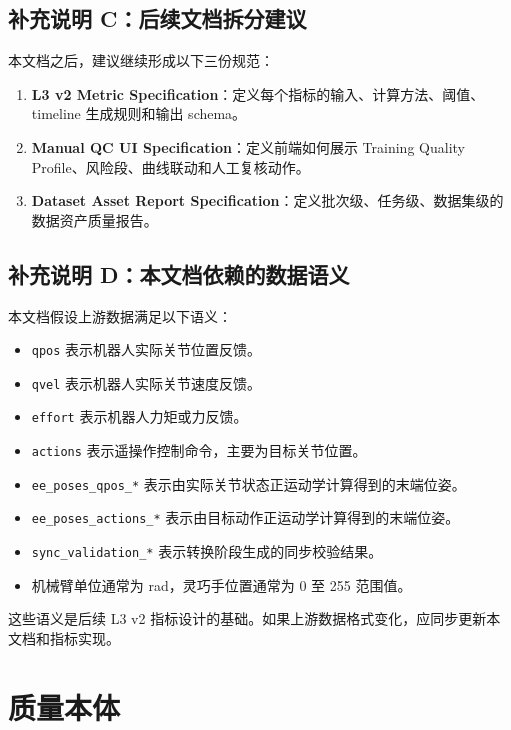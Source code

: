\documentclass[UTF8,zihao=-4,oneside,openany]{ctexrep}
\begin{document}
\section{补充说明 C：后续文档拆分建议}

本文档之后，建议继续形成以下三份规范：

\begin{enumerate}
  \item \textbf{L3 v2 Metric Specification}：定义每个指标的输入、计算方法、阈值、timeline 生成规则和输出 schema。
  \item \textbf{Manual QC UI Specification}：定义前端如何展示 Training Quality Profile、风险段、曲线联动和人工复核动作。
  \item \textbf{Dataset Asset Report Specification}：定义批次级、任务级、数据集级的数据资产质量报告。
\end{enumerate}

\section{补充说明 D：本文档依赖的数据语义}

本文档假设上游数据满足以下语义：

\begin{itemize}
  \item \texttt{qpos} 表示机器人实际关节位置反馈。
  \item \texttt{qvel} 表示机器人实际关节速度反馈。
  \item \texttt{effort} 表示机器人力矩或力反馈。
  \item \texttt{actions} 表示遥操作控制命令，主要为目标关节位置。
  \item \texttt{ee\_poses\_qpos\_*} 表示由实际关节状态正运动学计算得到的末端位姿。
  \item \texttt{ee\_poses\_actions\_*} 表示由目标动作正运动学计算得到的末端位姿。
  \item \texttt{sync\_validation\_*} 表示转换阶段生成的同步校验结果。
  \item 机械臂单位通常为 rad，灵巧手位置通常为 0 至 255 范围值。
\end{itemize}

这些语义是后续 L3 v2 指标设计的基础。如果上游数据格式变化，应同步更新本文档和指标实现。

\clearpage

\chapter{质量本体}
\end{document}

